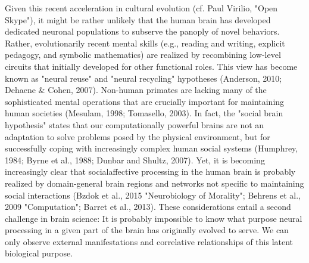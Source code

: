 \documentclass[authoryear,review,3p]{elsarticle}
\begin{document}
Given this recent acceleration in cultural evolution
(cf. Paul Virilio, "Open Skype"),
it might be
rather unlikely that the human brain has developed dedicated
neuronal populations to subserve the panoply of novel behaviors.
Rather, evolutionarily recent mental skills
(e.g., reading and writing, explicit pedagogy, and
symbolic mathematics)
are realized by recombining low-level circuits that initially
developed for other functional roles.
This view has become known as
"neural reuse" and "neural recycling" hypotheses
(Anderson, 2010; Dehaene \& Cohen, 2007).
Non-human primates are lacking many of the sophisticated
mental operations that
are crucially important for maintaining human societies
(Mesulam, 1998; Tomasello, 2003).
In fact,
the "social brain hypothesis" states that our
computationally powerful brains are not an adaptation to
solve problems posed by the physical environment,
but for successfully coping with increasingly complex human social systems
(Humphrey, 1984; Byrne et al., 1988; Dunbar and Shultz, 2007).
Yet, it is becoming increasingly clear that socialaffective processing
in the human brain is probably realized by domain-general
brain regions and networks not specific to maintaining social interactions
(Bzdok et al., 2015 "Neurobiology of Morality"; Behrens et al., 2009 "Computation";
Barret et al., 2013).
These considerations entail a second challenge in brain science:
It is probably impossible to know what purpose neural
processing in a given part of the brain has originally evolved to serve.
We can only observe external manifestations and correlative relationships of
this latent biological purpose.
\end{document}

